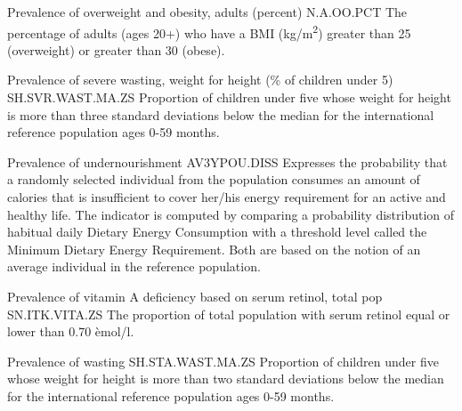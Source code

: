 \begin{MetadataCollection}
\begin{metadata}{ Prevalence of overweight and obesity, adults (percent) }{ N.A.OO.PCT }
The percentage of adults (ages 20+) who have a BMI (kg/m\textsuperscript{2}) greater than 25 (overweight) or greater than 30 (obese). 
\end{metadata}

\begin{metadata}{ Prevalence of severe wasting, weight for height (\% of children under 5) }{ SH.SVR.WAST.MA.ZS }
Proportion of children under five whose weight for height is more than three standard deviations below the median for the international reference population ages 0-59 months. 
\end{metadata}

\begin{metadata}{ Prevalence of undernourishment }{ AV3YPOU.DISS }
Expresses the probability that a randomly selected individual from the population consumes an amount of calories that is insufficient to cover her/his energy requirement for an active and healthy life. 
The indicator is computed by comparing a probability distribution of habitual daily Dietary Energy Consumption with a threshold level called the Minimum Dietary Energy Requirement. Both are based on the notion of an average individual in the reference population.   
\end{metadata}

\begin{metadata}{ Prevalence of vitamin A deficiency based on serum retinol, total pop }{ SN.ITK.VITA.ZS }
The proportion of total population with serum retinol equal or lower than 0.70 \`{e}mol/l.  
\end{metadata}

\begin{metadata}{ Prevalence of wasting }{ SH.STA.WAST.MA.ZS }
Proportion of children under five whose weight for height is more than two standard deviations below the median for the international reference population ages 0-59 months. 
\end{metadata}


\end{MetadataCollection}
